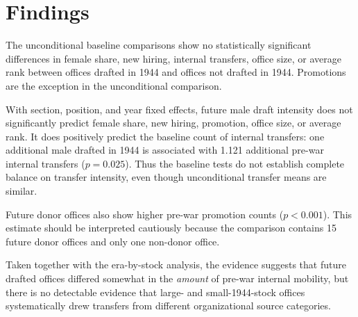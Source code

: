 \section*{Findings}
The unconditional baseline comparisons show no statistically significant differences in female share, new hiring, internal transfers, office size, or average rank between offices drafted in 1944 and offices not drafted in 1944. Promotions are the exception in the unconditional comparison.

With section, position, and year fixed effects, future male draft intensity does not significantly predict female share, new hiring, promotion, office size, or average rank. It does positively predict the baseline count of internal transfers: one additional male drafted in 1944 is associated with 1.121 additional pre-war internal transfers ($p=0.025$). Thus the baseline tests do not establish complete balance on transfer intensity, even though unconditional transfer means are similar.

Future donor offices also show higher pre-war promotion counts ($p<0.001$). This estimate should be interpreted cautiously because the comparison contains 15 future donor offices and only one non-donor office.

Taken together with the era-by-stock analysis, the evidence suggests that future drafted offices differed somewhat in the \emph{amount} of pre-war internal mobility, but there is no detectable evidence that large- and small-1944-stock offices systematically drew transfers from different organizational source categories.
